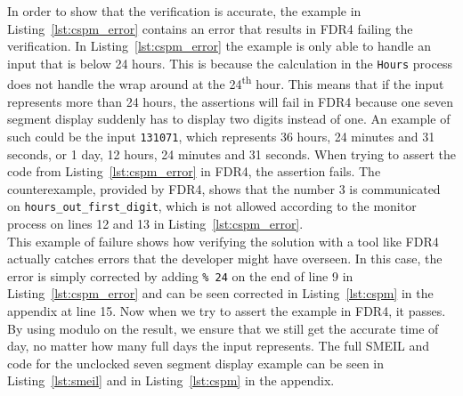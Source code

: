 In order to show that the verification is accurate, the example in Listing~\ref{lst:cspm_error} contains an error that results in FDR4 failing the verification. In Listing~\ref{lst:cspm_error} the example is only able to handle an input that is below 24 hours. This is because the calculation in the \texttt{Hours} process does not handle the wrap around at the 24\textsuperscript{th} hour. This means that if the input represents more than 24 hours, the assertions will fail in FDR4 because one seven segment display suddenly has to display two digits instead of one. An example of such could be the input \texttt{131071}, which represents 36 hours, 24 minutes and 31 seconds, or 1 day, 12 hours, 24 minutes and 31 seconds. When trying to assert the code from Listing~\ref{lst:cspm_error} in FDR4, the assertion fails. The counterexample, provided by FDR4, shows that the number 3 is communicated on \texttt{hours\_out\_first\_digit}, which is not allowed according to the monitor process on lines 12 and 13 in Listing~\ref{lst:cspm_error}.\\

This example of failure shows how verifying the solution with a tool like FDR4 actually catches errors that the developer might have overseen. In this case, the error is simply corrected by adding \texttt{\% 24} on the end of line 9 in Listing~\ref{lst:cspm_error} and can be seen corrected in Listing~\ref{lst:cspm} in the appendix at line 15. Now when we try to assert the example in FDR4, it passes. By using modulo on the result, we ensure that we still get the accurate time of day, no matter how many full days the input represents.
The full SMEIL and \cspm{} code for the unclocked seven segment display example can be seen in Listing~\ref{lst:smeil} and in Listing~\ref{lst:cspm} in the appendix.

